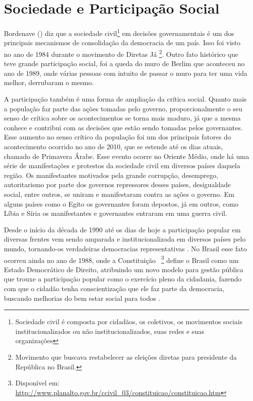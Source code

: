 \chapter{Sociedade e Participação Social}
\label{cap:sociedadepsocial}

Bordenave (\citeyear{bordenave1983participacao}) diz que a sociedade civil\footnote{Sociedade civil é composta por cidadãos, os coletivos, os movimentos sociais institucionalizados ou não institucionalizados, suas redes e suas organizações} em decisões governamentais é um dos principais mecanismos de consolidação da democracia de um país. Isso foi visto no ano de 1984 durante o movimento de Diretas Já \footnote{Movimento que buscava restabelecer as eleições diretas para presidente da República no Brasil.}. Outro fato histórico que teve grande participação social, foi a queda do muro de Berlim que aconteceu no ano de 1989, onde várias pessoas com intuito de passar o muro para ter uma vida melhor, derrubaram o mesmo. 

A participação também é uma forma de ampliação da crítica social. Quanto mais a população faz parte das ações tomadas pelo governo, proporcionalmente o seu senso de crítica sobre os acontecimentos se torna mais maduro, já que a mesma conhece e contribui com as decisões que estão sendo tomadas pelos governantes. Esse aumento no senso crítico da população foi um dos principais fatores do acontecimento ocorrido no ano de 2010, que se estende até os dias atuais, chamado de Primavera Árabe. Esse evento ocorre no Oriente Médio, onde há uma série de manifestações e protestos da sociedade civil em diversos países daquela região. Os manifestantes motivados pela grande corrupção, desemprego, autoritarismo por parte dos governos repressores desses países, desigualdade social, entre outros, se uniram e manifestaram contra as ações o governo. Em alguns países como o Egito os governantes foram depostos, já em outros, como Líbia e Síria os manifestantes e governantes entraram em uma guerra civil.  

Desde o início da década de 1990 até os dias de hoje a participação popular em diversas frentes vem sendo amparada e institucionalizada em diversos países pelo mundo, tornando-os verdadeiras democracias representativas \cite{jacobi2001participacao}. No Brasil esse fato ocorreu ainda no ano de 1988, onde a Constituição \citeyear{cf}~\footnote{Disponível em: \url{http://www.planalto.gov.br/ccivil_03/constituicao/constituicao.htm}} define o Brasil como um Estado Democrático de Direito, atribuindo um novo modelo para gestão pública que trouxe a participação popular como o exercício pleno da cidadania, fazendo com que o cidadão tenha conscientização que ele faz parte da democracia, buscando melhorias do bem estar social para todos \cite{scuassante2009constituicao}. 


